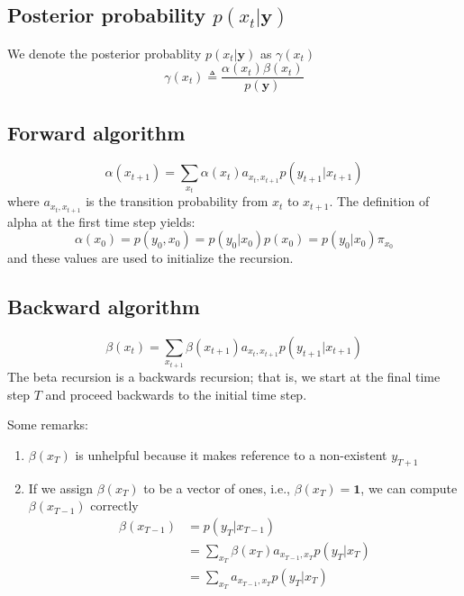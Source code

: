 \documentclass[journal=jpcbfk,manuscript=article,layout=singlecolumn,articletitle=true]{achemso}
\begin{document}
\subsection{Posterior probability $p(x_t | \textbf{y})$}
We denote the posterior probablity $p(x_t | \textbf{y})$ as $\gamma(x_t)$
\begin{equation}
\gamma(x_t) \triangleq \frac{\alpha(x_t)\beta(x_t)}{p(\textbf{y})}
\end{equation}

\subsection{Forward algorithm}
\begin{equation}
\alpha(x_{t+1}) = \sum_{x_t} \alpha(x_t) a_{x_t,x_{t+1}} p(y_{t+1}|x_{t+1})
\end{equation}
where $a_{x_t,x_{t+1}}$ is the transition probability from $x_t$ to $x_{t+1}$. The definition of alpha at the first time step yields:
\begin{equation}
\alpha(x_0) = p(y_0, x_0) = p(y_0|x_0)p(x_0) = p(y_0|x_0) \pi_{x_0} 
\end{equation}
and these values are used to initialize the recursion.

\subsection{Backward algorithm}
\begin{equation}
\beta(x_t) = \sum_{x_{t+1}} \beta(x_{t+1}) a_{x_t,x_{t+1}} p(y_{t+1}|x_{t+1})
\end{equation}
The beta recursion is a backwards recursion; that is, we start at the final time step $T$ and proceed backwards to the initial time step.

Some remarks:
\begin{enumerate}
\item $\beta(x_T)$ is unhelpful because it makes reference to a non-existent $y_{T+1}$
\item If we assign $\beta(x_T)$ to be a vector of ones, i.e., $\beta(x_T)=\textbf{1}$, we can compute $\beta(x_{T-1})$ correctly
\begin{equation}
\begin{split}
\beta(x_{T-1}) &= p(y_T|x_{T-1}) \\
&= \sum_{x_T} \beta(x_T) a_{x_{T-1}, x_T} p(y_T|x_T) \\
&= \sum_{x_T} a_{x_{T-1}, x_T} p(y_T|x_T) 
\end{split}
\end{equation}
\end{enumerate}
\end{document}
